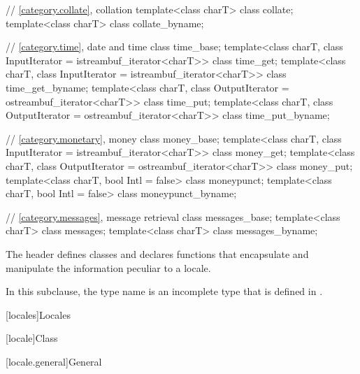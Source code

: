 \begin{codeblock}
{  // \ref{category.collate}, collation
  template<class charT> class collate;
  template<class charT> class collate_byname;

  // \ref{category.time}, date and time
  class time_base;
  template<class charT, class InputIterator = istreambuf_iterator<charT>>
    class time_get;
  template<class charT, class InputIterator = istreambuf_iterator<charT>>
    class time_get_byname;
  template<class charT, class OutputIterator = ostreambuf_iterator<charT>>
    class time_put;
  template<class charT, class OutputIterator = ostreambuf_iterator<charT>>
    class time_put_byname;

  // \ref{category.monetary}, money
  class money_base;
  template<class charT, class InputIterator = istreambuf_iterator<charT>>
    class money_get;
  template<class charT, class OutputIterator = ostreambuf_iterator<charT>>
    class money_put;
  template<class charT, bool Intl = false>
    class moneypunct;
  template<class charT, bool Intl = false>
    class moneypunct_byname;

  // \ref{category.messages}, message retrieval
  class messages_base;
  template<class charT> class messages;
  template<class charT> class messages_byname;
}
\end{codeblock}

\pnum
The header 
defines classes and declares functions
that encapsulate and manipulate the information peculiar to a locale.
\begin{footnote}
In this subclause, the type name 
is an incomplete type that is defined in .
\end{footnote}

[locales]{Locales}

[locale]{Class }

[locale.general]{General}

